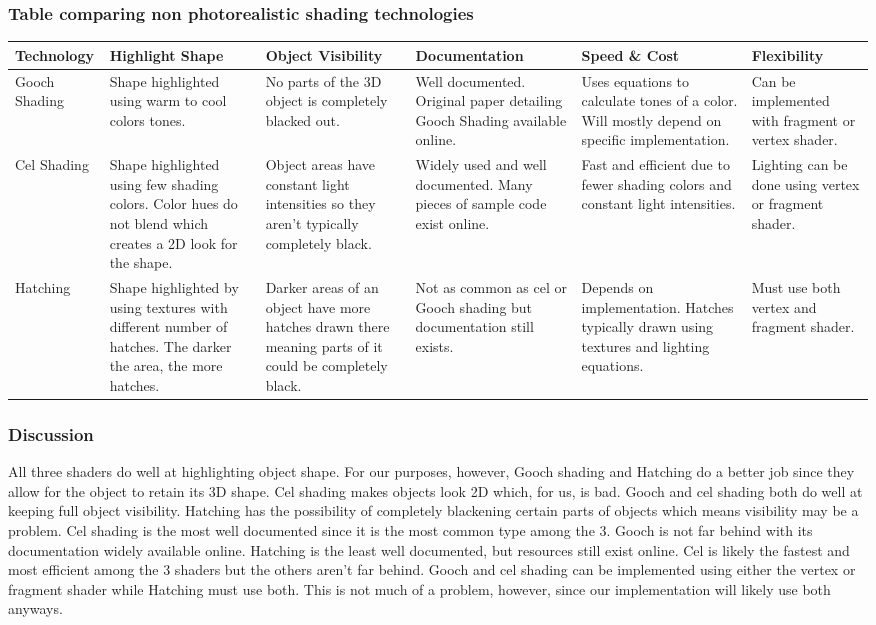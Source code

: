 \documentclass[10pt,journal,compsoc,draftclsnofoot]{IEEEtran}
\begin{document}
\subsubsection{Table comparing non photorealistic shading technologies}
\begin{tabular}{ | m{7em} | m{7em} | m{7em} | m{7em} | m{7em} | m{7em} |  } 
\hline
\textbf{Technology}  & \textbf{Highlight Shape} & \textbf{Object Visibility} & \textbf{Documentation} & \textbf{Speed \& Cost} & \textbf{Flexibility} \\ \hline
Gooch Shading & Shape highlighted using warm to cool colors tones. & No parts of the 3D object is completely blacked out. & Well documented. Original paper detailing Gooch Shading available online. & Uses equations to calculate tones of a color. Will mostly depend on specific implementation. & Can be implemented with fragment or vertex shader.  \\ \hline
Cel Shading & Shape highlighted using few shading colors. Color hues do not blend which creates a 2D look for the shape. & Object areas have constant light intensities so they aren't typically completely black. & Widely used and well documented. Many pieces of sample code exist online. & Fast and efficient due to fewer shading colors and constant light intensities. & Lighting can be done using vertex or fragment shader.  \\ \hline
Hatching & Shape highlighted by using textures with different number of hatches. The darker the area, the more hatches. & Darker areas of an object have more hatches drawn there meaning parts of it could be completely black. & Not as common as cel or Gooch shading but documentation still exists. & Depends on implementation. Hatches typically drawn using textures and lighting equations. & Must use both vertex and fragment shader. \\ \hline
\end{tabular}

\subsubsection{Discussion}
All three shaders do well at highlighting object shape. 
For our purposes, however, Gooch shading and Hatching do a better job since they allow for the object to retain its 3D shape. 
Cel shading makes objects look 2D which, for us, is bad.
Gooch and cel shading both do well at keeping full object visibility. 
Hatching has the possibility of completely blackening certain parts of objects which means visibility may be a problem.
Cel shading is the most well documented since it is the most common type among the 3. 
Gooch is not far behind with its documentation widely available online.
Hatching is the least well documented, but resources still exist online.
Cel is likely the fastest and most efficient among the 3 shaders but the others aren't far behind.
Gooch and cel shading can be implemented using either the vertex or fragment shader while Hatching must use both.
This is not much of a problem, however, since our implementation will likely use both anyways.
\end{document}
